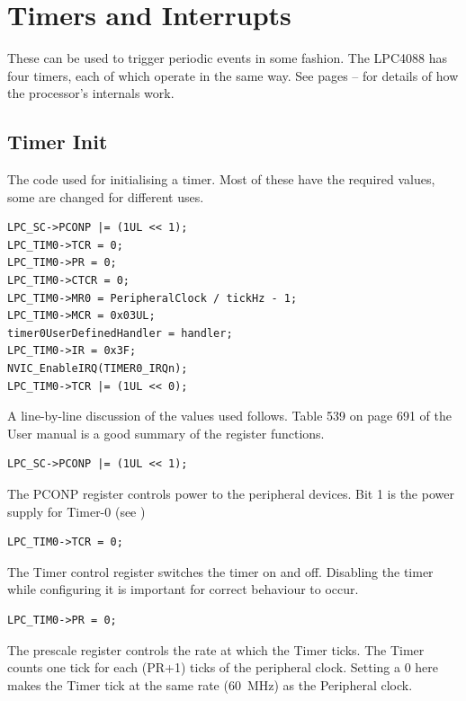 \documentclass[a4paper]{tufte-handout}
\begin{document}
\clearpage
\section{Timers and Interrupts}
  These can be used to trigger periodic
events in some fashion.  The LPC4088 has four timers, each of which
operate in the same way.  See pages
\pageref{sec:timer-behavior}--\pageref{sec:timer-behavior-end} for
details of how the processor's internals work.

\subsection{Timer Init}
The code used for initialising a  timer.  Most of these have the
required values, some are changed for different uses.  
\begin{verbatim}
LPC_SC->PCONP |= (1UL << 1);
LPC_TIM0->TCR = 0;
LPC_TIM0->PR = 0;
LPC_TIM0->CTCR = 0;
LPC_TIM0->MR0 = PeripheralClock / tickHz - 1;
LPC_TIM0->MCR = 0x03UL;
timer0UserDefinedHandler = handler;
LPC_TIM0->IR = 0x3F;
NVIC_EnableIRQ(TIMER0_IRQn);
LPC_TIM0->TCR |= (1UL << 0);
\end{verbatim}
A line-by-line discussion of the values used follows.  Table 539 on
page 691 of the User manual \citep{lpc4088} is a good summary of the
register functions.

\begin{verbatim}
LPC_SC->PCONP |= (1UL << 1);
\end{verbatim}
The PCONP register controls power to the peripheral devices.  Bit 1 is
the power supply for Timer-0 (see \citep[Table 14, pg.30]{lpc4088})

\begin{verbatim}
LPC_TIM0->TCR = 0;
\end{verbatim}
The Timer control register \citep[24.6.2]{lpc4088} switches the timer
on and off.  Disabling the timer while configuring it is important for
correct behaviour to occur.

\begin{verbatim}
LPC_TIM0->PR = 0;
\end{verbatim}
The prescale register \citep[24.6.4]{lpc4088} controls the rate at
which the Timer ticks.  The Timer counts one tick for each (PR+1)
ticks of the peripheral clock.  Setting a 0 here makes the Timer tick
at the same rate (\SI{60}{\mega\hertz}) as the Peripheral clock.
\end{document}
